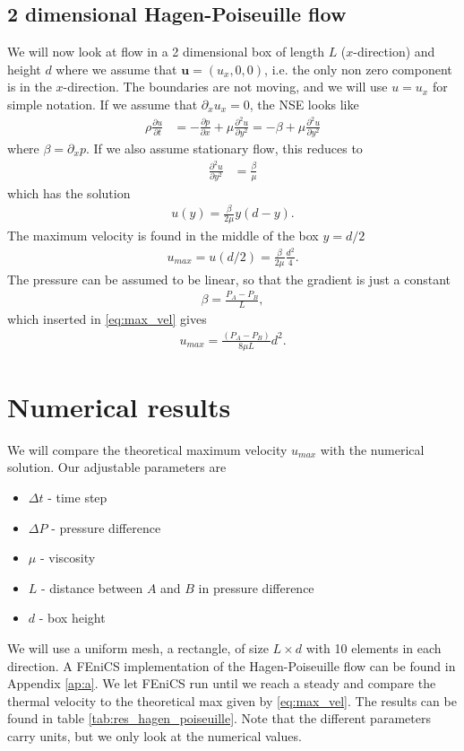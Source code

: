 \documentclass[a4paper,10pt]{article}
\renewcommand{\vec}[1]{\mathbf{#1}}
\renewcommand{\(}{\left(}
\renewcommand{\)}{\right)}
\newcommand{\dpart}[2]{\frac{\partial#1}{\partial#2}}
\newcommand{\dpartt}[2]{\frac{\partial^2#1}{\partial#2^2}}
\begin{document}
\subsection{2 dimensional Hagen-Poiseuille flow}
We will now look at flow in a 2 dimensional box of length $L$ ($x$-direction) and height $d$ where we assume that $\vec u = (u_x,0,0)$, i.e. the only non zero component is in the $x$-direction. The boundaries are not moving, and we will use $u=u_x$ for simple notation. If we assume that $\partial_x u_x=0$, the NSE looks like
\begin{align*}
  \rho\dpart{u}{t} &= -\dpart{p}{x} + \mu\dpartt{u}{y} = -\beta + \mu\dpartt{u}{y}
\end{align*}
where $\beta = \partial_x p$. If we also assume stationary flow, this reduces to
\begin{align*}
  \dpartt{u}{y} &= \frac{\beta}{\mu}
\end{align*}
which has the solution
\begin{align*}
  u(y) = \frac{\beta}{2\mu}y(d-y).
\end{align*}
The maximum velocity is found in the middle of the box $y=d/2$
\begin{align}
  \label{eq:max_vel}
  u_{max} = u(d/2) = \frac{\beta}{2\mu}\frac{d^2}{4}.
\end{align}
The pressure can be assumed to be linear, so that the gradient is just a constant
\begin{align*}
  \beta = \frac{P_A-P_B}{L},
\end{align*}
which inserted in \eqref{eq:max_vel} gives
\begin{align*}
  u_{max} = \frac{(P_A-P_B)}{8\mu L}d^2.
\end{align*}

\section{Numerical results}
We will compare the theoretical maximum velocity $u_{max}$ with the numerical solution. Our adjustable parameters are
\begin{itemize}
\item $\Delta t$ - time step
\item $\Delta P$ - pressure difference
\item $\mu$ - viscosity
\item $L$ - distance between $A$ and $B$ in pressure difference
\item $d$ - box height
\end{itemize}
We will use a uniform mesh, a rectangle, of size $L\times d$ with 10 elements in each direction. A FEniCS implementation of the Hagen-Poiseuille flow can be found in Appendix \ref{ap:a}. We let FEniCS run until we reach a steady and compare the thermal velocity to the theoretical max given by \eqref{eq:max_vel}. The results can be found in table \ref{tab:res_hagen_poiseuille}. Note that the different parameters carry units, but we only look at the numerical values.
\end{document}

